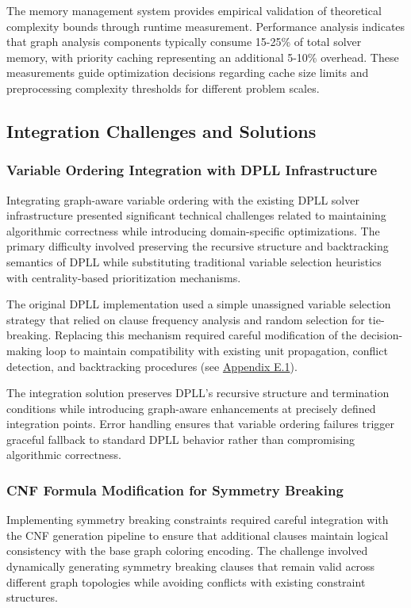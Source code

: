The memory management system provides empirical validation of theoretical complexity bounds through runtime measurement. Performance analysis indicates that graph analysis components typically consume 15-25\% of total solver memory, with priority caching representing an additional 5-10\% overhead. These measurements guide optimization decisions regarding cache size limits and preprocessing complexity thresholds for different problem scales.

\subsection{Integration Challenges and Solutions}

\subsubsection{Variable Ordering Integration with DPLL Infrastructure}

Integrating graph-aware variable ordering with the existing DPLL solver infrastructure presented significant technical challenges related to maintaining algorithmic correctness while introducing domain-specific optimizations. The primary difficulty involved preserving the recursive structure and backtracking semantics of DPLL while substituting traditional variable selection heuristics with centrality-based prioritization mechanisms.

The original DPLL implementation used a simple unassigned variable selection strategy that relied on clause frequency analysis and random selection for tie-breaking. Replacing this mechanism required careful modification of the decision-making loop to maintain compatibility with existing unit propagation, conflict detection, and backtracking procedures (see \hyperref[appendix:variable-ordering-integration]{Appendix E.1}).

The integration solution preserves DPLL's recursive structure and termination conditions while introducing graph-aware enhancements at precisely defined integration points. Error handling ensures that variable ordering failures trigger graceful fallback to standard DPLL behavior rather than compromising algorithmic correctness.

\subsubsection{CNF Formula Modification for Symmetry Breaking}

Implementing symmetry breaking constraints required careful integration with the CNF generation pipeline to ensure that additional clauses maintain logical consistency with the base graph coloring encoding. The challenge involved dynamically generating symmetry breaking clauses that remain valid across different graph topologies while avoiding conflicts with existing constraint structures.

